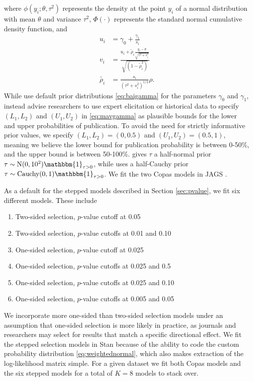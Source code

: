 \documentclass[12pt]{article}   	%
\numberwithin{equation}{section}
\begin{document}
where $\phi(y_i; \theta, \tau^2)$ represents the density at the point $y_i$ of a normal distribution with mean $\theta$ and variance $\tau^2$, $\Phi(\cdot)$ represents the standard normal cumulative density function, and 
\begin{align}
u_i &= \gamma_0 + \frac{\gamma_1}{s_i} \nonumber \\
v_i &= \frac{u_i + \tilde{\rho}_i \frac{y_i - \theta}{\sqrt{\tau^2 + s_i^2}}}{\sqrt{(1 - \tilde{\rho}_i^2)}} \nonumber \\
\tilde{\rho_i} &= \frac{s_i}{(\tau^2 + s_i^2)^{1/2}} \rho. \nonumber
\end{align}
While \citet{bai2020} use default prior distributions \eqref{eq:baigamma} for the parameters $\gamma_0$ and $\gamma_1$, \citet{mavridis2013copas} instead advise researchers to use expert elicitation or historical data to specify $(L_1, L_2)$ and $(U_1, U_2)$ in \eqref{eq:mavgamma} as plausible bounds for the lower and upper probabilities of publication. To avoid the need for strictly informative prior values, we specify $(L_1, L_2) = (0, 0.5)$ and $(U_1, U_2) = (0.5, 1)$, meaning we believe the lower bound for publication probability is between 0-50\%, and the upper bound is between 50-100\%. \citet{mavridis2013copas} gives $\tau$ a half-normal prior $\tau \sim \text{N}(0, 10^2) \mathbbm{1}_{\tau > 0}$, while \citet{bai2020} uses a half-Cauchy prior $\tau \sim \text{Cauchy}(0, 1) \mathbbm{1}_{\tau > 0}$. We fit the two Copas models in JAGS \citep{plummer2003jags}.

As a default for the stepped models described in Section \ref{sec:pvalue}, we fit six different models. These include
\begin{enumerate}
\item{Two-sided selection, $p$-value cutoff at 0.05}
\item{Two-sided selection, $p$-value cutoffs at 0.01 and 0.10}
\item{One-sided selection, $p$-value cutoff at 0.025}
\item{One-sided selection, $p$-value cutoffs at 0.025 and 0.5}
\item{One-sided selection, $p$-value cutoffs at 0.025 and 0.10}
\item{One-sided selection, $p$-value cutoffs at 0.005 and 0.05}
\end{enumerate}
We incorporate more one-sided than two-sided selection models under an assumption that one-sided selection is more likely in practice, as journals and researchers may select for results that match a specific directional effect. We fit the stepped selection models in Stan \citep{gelman2015stan} because of the ability to code the custom probability distribution \eqref{eq:weightednormal}, which also makes extraction of the log-likelihood matrix simple. For a given dataset we fit both Copas models and the six stepped models for a total of $K=8$ models to stack over.
\end{document}
